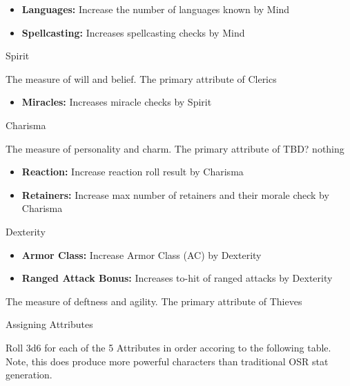 \begin{multicols}{2}
\begin{itemize}
\setlength\itemsep{0em}
	\item \textbf{Languages:} Increase the number of languages known by Mind
	\item \textbf{Spellcasting:} Increases spellcasting checks by Mind
\end{itemize}

\begin{mercHeading}
Spirit
\end{mercHeading}
The measure of will and belief. The primary attribute of Clerics

\begin{itemize}
\setlength\itemsep{0em}
	\item \textbf{Miracles:} Increases miracle checks by Spirit
\end{itemize}

\begin{mercHeading}
Charisma
\end{mercHeading}
The measure of personality and charm. The primary attribute of TBD? nothing

\begin{itemize}
\setlength\itemsep{0em}
	\item \textbf{Reaction:} Increase reaction roll result by Charisma
	\item \textbf{Retainers:} Increase max number of retainers and their morale check by Charisma
\end{itemize}

\begin{mercHeading}
Dexterity
\end{mercHeading}

\begin{itemize}
\setlength\itemsep{0em}
	\item \textbf{Armor Class:} Increase Armor Class (AC) by Dexterity
	\item \textbf{Ranged Attack Bonus:} Increases to-hit of ranged attacks by Dexterity
\end{itemize}
The measure of deftness and agility. The primary attribute of Thieves

\begin{mercHeading}
Assigning Attributes
\end{mercHeading}

Roll 3d6 for each of the 5 Attributes in order accoring to the following table. Note, this does produce more powerful characters than traditional OSR stat generation.



\end{multicols}
